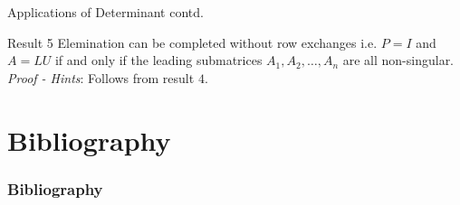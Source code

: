 \documentclass{beamer}
\begin{document}
\begin{frame}{Applications of Determinant contd.}
\begin{block}{Result 5}
Elemination can be completed without row exchanges i.e. $P = I$ and $A = LU$ if and only if the leading submatrices $A_1, A_2, \ldots, A_n$ are all non-singular.\\
\textit{Proof - Hints}: Follows from result $4$.
\end{block}
\end{frame}


\section{Bibliography}
\begin{frame}[t]
    \frametitle{Bibliography}
    \nocite{*}
    \printbibliography
\end{frame}
\end{document}
